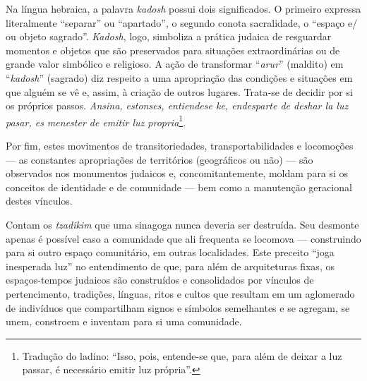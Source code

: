 Na língua hebraica, a palavra \emph{kadosh} possui dois significados. O
primeiro expressa literalmente ``separar'' ou ``apartado'', o segundo
conota sacralidade, o ``espaço e/\,ou objeto sagrado''. \emph{Kadosh},
logo, simboliza a prática judaica de resguardar momentos e objetos que
são preservados para situações extraordinárias ou de grande valor
simbólico e religioso. A ação de transformar ``\emph{arur}'' (maldito)
em ``\emph{kadosh}'' (sagrado) diz respeito a uma apropriação das
condições e situações em que alguém se vê e, assim, à criação de outros
lugares. Trata-se de decidir por si os próprios passos. \emph{Ansina,
estonses, entiendese ke, endesparte de deshar la luz pasar, es menester
de emitir luz propria}\footnote{Tradução do ladino: ``Isso, pois,
  entende-se que, para além de deixar a luz passar, é necessário emitir
  luz própria''.}.

Por fim, estes movimentos de transitoriedades, transportabilidades e
locomoções --- as constantes apropriações de territórios (geográficos ou
não) --- são observados nos monumentos judaicos e, concomitantemente,
moldam para si os conceitos de identidade e de comunidade --- bem como a
manutenção geracional destes vínculos.

\begin{center}\end{center}

\noindent{}Contam os \emph{tzadikim} que uma sinagoga nunca deveria ser destruída.
Seu desmonte apenas é possível caso a comunidade que ali frequenta se
locomova --- construindo para si outro espaço comunitário, em outras
localidades. Este preceito ``joga inesperada luz'' no
entendimento de que, para além de arquiteturas fixas, os espaços-tempos
judaicos são construídos e consolidados por vínculos de pertencimento,
tradições, línguas, ritos e cultos que resultam em um aglomerado de
indivíduos que compartilham signos e símbolos semelhantes e se agregam,
se unem, constroem e inventam para si uma comunidade.

